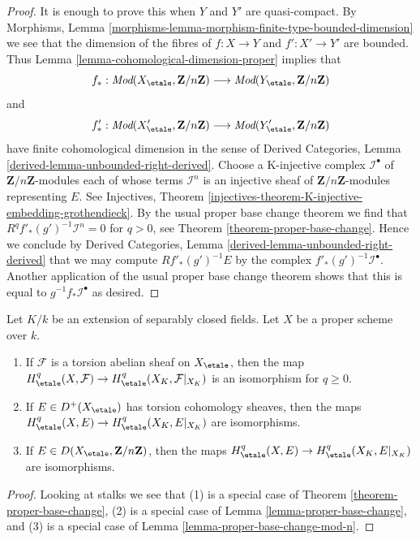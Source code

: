\begin{proof}
It is enough to prove this when $Y$ and $Y'$ are quasi-compact.
By Morphisms, Lemma
\ref{morphisms-lemma-morphism-finite-type-bounded-dimension}
we see that the dimension of the fibres of
$f : X \to Y$ and $f' : X' \to Y'$ are bounded. Thus
Lemma \ref{lemma-cohomological-dimension-proper} implies that
$$
f_* :
\textit{Mod}(X_\etale, \mathbf{Z}/n\mathbf{Z})
\longrightarrow
\textit{Mod}(Y_\etale, \mathbf{Z}/n\mathbf{Z})
$$
and
$$
f'_* :
\textit{Mod}(X'_\etale, \mathbf{Z}/n\mathbf{Z})
\longrightarrow
\textit{Mod}(Y'_\etale, \mathbf{Z}/n\mathbf{Z})
$$
have finite cohomological dimension in the sense of
Derived Categories, Lemma \ref{derived-lemma-unbounded-right-derived}.
Choose a K-injective complex $\mathcal{I}^\bullet$
of $\mathbf{Z}/n\mathbf{Z}$-modules each of whose
terms $\mathcal{I}^n$ is an injective sheaf of
$\mathbf{Z}/n\mathbf{Z}$-modules representing $E$.
See Injectives, Theorem
\ref{injectives-theorem-K-injective-embedding-grothendieck}.
By the usual proper base change theorem we find
that $R^qf'_*(g')^{-1}\mathcal{I}^n = 0$ for $q > 0$, see
Theorem \ref{theorem-proper-base-change}.
Hence we conclude by 
Derived Categories, Lemma \ref{derived-lemma-unbounded-right-derived}
that we may compute $Rf'_*(g')^{-1}E$ by the complex
$f'_*(g')^{-1}\mathcal{I}^\bullet$. Another application
of the usual proper base change theorem shows that
this is equal to $g^{-1}f_*\mathcal{I}^\bullet$ as desired.
\end{proof}

\begin{lemma}
\label{lemma-base-change-separably-closed}
Let $K/k$ be an extension of separably closed fields.
Let $X$ be a proper scheme over $k$.
\begin{enumerate}
\item If $\mathcal{F}$ is a torsion abelian sheaf on $X_\etale$, then
the map $H^q_\etale(X, \mathcal{F}) \to H^q_\etale(X_K, \mathcal{F}|_{X_K})$
is an isomorphism for $q \geq 0$.
\item If $E \in D^+(X_\etale)$ has torsion cohomology sheaves,
then the maps $H^q_\etale(X, E) \to H^q_\etale(X_K, E|_{X_K})$
are isomorphisms.
\item If $E \in D(X_\etale, \mathbf{Z}/n\mathbf{Z})$, then the 
maps $H^q_\etale(X, E) \to H^q_\etale(X_K, E|_{X_K})$
are isomorphisms.
\end{enumerate}
\end{lemma}

\begin{proof}
Looking at stalks we see that (1) is a special case of
Theorem \ref{theorem-proper-base-change}, (2) is a special case of
Lemma \ref{lemma-proper-base-change}, and (3) is a special case of
Lemma \ref{lemma-proper-base-change-mod-n}.
\end{proof}

